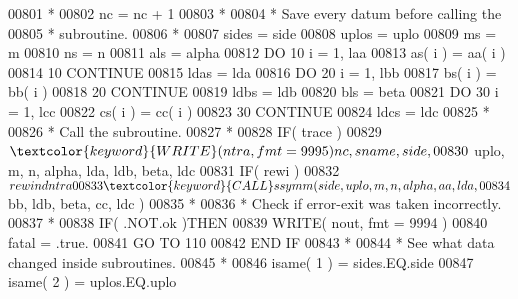\begin{DoxyCode}
00801 \textcolor{comment}{*}
00802                         nc = nc + 1
00803 \textcolor{comment}{*}
00804 \textcolor{comment}{*                       Save every datum before calling the}
00805 \textcolor{comment}{*                       subroutine.}
00806 \textcolor{comment}{*}
00807                         sides = side
00808                         uplos = uplo
00809                         ms = m
00810                         ns = n
00811                         als = alpha
00812                         \textcolor{keywordflow}{DO} 10 i = 1, laa
00813                            as( i ) = aa( i )
00814    10                   \textcolor{keywordflow}{CONTINUE}
00815                         ldas = lda
00816                         \textcolor{keywordflow}{DO} 20 i = 1, lbb
00817                            bs( i ) = bb( i )
00818    20                   \textcolor{keywordflow}{CONTINUE}
00819                         ldbs = ldb
00820                         bls = beta
00821                         \textcolor{keywordflow}{DO} 30 i = 1, lcc
00822                            cs( i ) = cc( i )
00823    30                   \textcolor{keywordflow}{CONTINUE}
00824                         ldcs = ldc
00825 \textcolor{comment}{*}
00826 \textcolor{comment}{*                       Call the subroutine.}
00827 \textcolor{comment}{*}
00828                         \textcolor{keywordflow}{IF}( trace )
00829      $                     \textcolor{keyword}{WRITE}( ntra, fmt = 9995 )nc, sname, side,
00830      $                     uplo, m, n, alpha, lda, ldb, beta, ldc
00831                         \textcolor{keywordflow}{IF}( rewi )
00832      $                     rewind ntra
00833                         \textcolor{keyword}{CALL }ssymm( side, uplo, m, n, alpha, aa, lda,
00834      $                              bb, ldb, beta, cc, ldc )
00835 \textcolor{comment}{*}
00836 \textcolor{comment}{*                       Check if error-exit was taken incorrectly.}
00837 \textcolor{comment}{*}
00838                         \textcolor{keywordflow}{IF}( .NOT.ok )\textcolor{keywordflow}{THEN}
00839                            \textcolor{keyword}{WRITE}( nout, fmt = 9994 )
00840                            fatal = .true.
00841                            \textcolor{keywordflow}{GO TO} 110
00842 \textcolor{keywordflow}{                        END IF}
00843 \textcolor{comment}{*}
00844 \textcolor{comment}{*                       See what data changed inside subroutines.}
00845 \textcolor{comment}{*}
00846                         isame( 1 ) = sides.EQ.side
00847                         isame( 2 ) = uplos.EQ.uplo

\end{DoxyCode}
